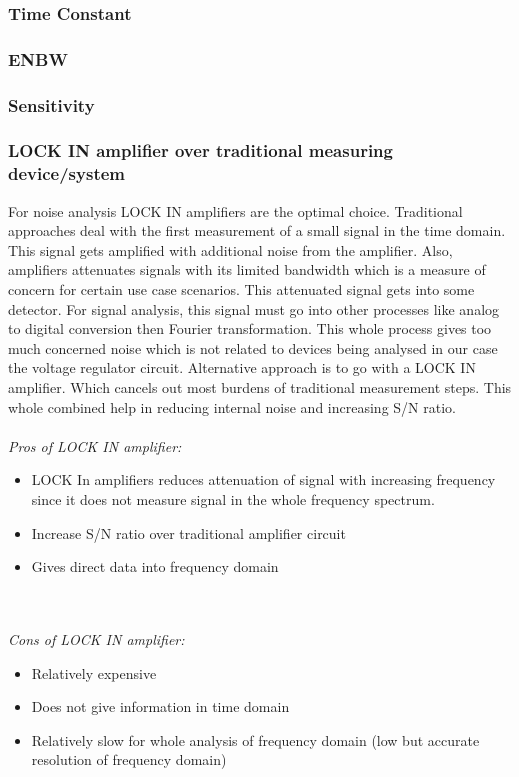 \subsubsection{Time Constant }

\subsubsection{ENBW}

\subsubsection{Sensitivity} 

\subsubsection{LOCK IN amplifier over traditional measuring device/system}

For noise analysis LOCK IN amplifiers are the optimal choice. Traditional approaches deal with the first measurement of a small signal in the time domain. This signal gets amplified with additional noise from the amplifier. Also, amplifiers attenuates signals with its limited bandwidth which is a measure of concern for certain use case scenarios. This attenuated signal gets into some detector. For signal analysis, this signal must go into other  processes like analog to digital conversion then Fourier transformation. This whole process gives too much concerned noise which is not related to devices being analysed in our case the voltage regulator circuit. Alternative approach is to go with a LOCK IN amplifier. Which cancels out most burdens of traditional measurement steps. This whole combined help in reducing internal noise and increasing S/N ratio.
\\
\\
\emph{\large Pros of LOCK IN amplifier:}
\begin{itemize}
\item LOCK In amplifiers reduces attenuation of signal with increasing frequency since it does not measure signal in the whole frequency spectrum.
\item Increase S/N ratio over traditional amplifier circuit
\item Gives direct data into frequency domain
\end{itemize}\\
\\
\emph {\large Cons of LOCK IN amplifier:}
\begin{itemize}
\item Relatively expensive
\item Does not give information in time domain
\item Relatively slow for whole analysis of frequency domain (low but accurate resolution of frequency domain)
\end{itemize}

